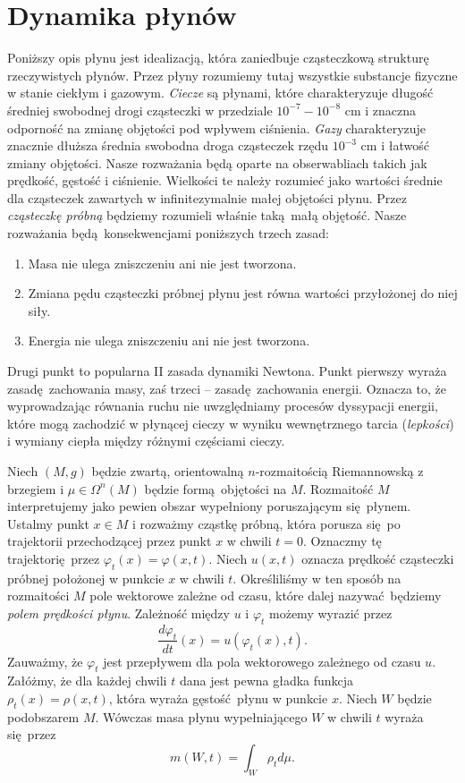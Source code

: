 \section{Dynamika płynów}

Poniższy opis płynu jest idealizacją, która zaniedbuje cząsteczkową strukturę rzeczywistych płynów. Przez płyny rozumiemy tutaj wszystkie substancje fizyczne w stanie ciekłym i gazowym. \emph{Ciecze} są płynami, które charakteryzuje długość średniej swobodnej drogi cząsteczki w przedziale \(10^{-7} - 10^{-8}\) cm i znaczna odporność na zmianę objętości pod wpływem ciśnienia. \emph{Gazy} charakteryzuje znacznie dłuższa średnia swobodna droga cząsteczek rzędu \(10^{-3}\) cm i łatwość zmiany objętości. Nasze rozważania będą oparte na obserwabliach takich jak prędkość, gęstość i ciśnienie. Wielkości te należy rozumieć jako wartości średnie dla cząsteczek zawartych w infinitezymalnie małej objętości płynu. Przez \emph{cząsteczkę próbną} będziemy rozumieli właśnie taką małą objętość. Nasze rozważania będą konsekwencjami poniższych trzech zasad:
\begin{enumerate}
    \item Masa nie ulega zniszczeniu ani nie jest tworzona.
    \item Zmiana pędu cząsteczki próbnej płynu jest równa wartości przyłożonej do niej siły.
    \item Energia nie ulega zniszczeniu ani nie jest tworzona. 
\end{enumerate}
Drugi punkt to popularna II zasada dynamiki Newtona. Punkt pierwszy wyraża zasadę zachowania masy, zaś trzeci – zasadę zachowania energii. Oznacza to, że wyprowadzając równania ruchu nie uwzględniamy procesów dyssypacji energii, które mogą zachodzić w płynącej cieczy w wyniku wewnętrznego tarcia (\emph{lepkości}) i wymiany ciepła między różnymi częściami cieczy.

Niech \((M, g)\) będzie zwartą, orientowalną \(n\)-rozmaitością Riemannowską z brzegiem i \(\mu \in \Omega^n(M)\) będzie formą objętości na \(M\). Rozmaitość \(M\) interpretujemy jako pewien obszar wypełniony poruszającym się płynem. Ustalmy punkt \(x\in M\) i rozważmy cząstkę próbną, która porusza się po trajektorii przechodzącej przez punkt \(x\) w chwili \(t=0\). Oznaczmy tę trajektorię przez \(\varphi_t(x)=\varphi(x,t)\). Niech \(u(x, t)\) oznacza prędkość cząsteczki próbnej położonej w punkcie \(x\) w chwili \(t\). Określiliśmy w ten sposób na rozmaitości \(M\) pole wektorowe zależne od czasu, które dalej nazywać będziemy \emph{polem prędkości płynu}. Zależność między \(u\) i \(\varphi_t\) możemy wyrazić przez
\begin{equation}\label{eq:first-step}
    \frac{d\varphi_t}{dt}(x) = u(\varphi_t(x), t). 
\end{equation}
Zauważmy, że \(\varphi_t\) jest przepływem dla pola wektorowego zależnego od czasu \(u\). Załóżmy, że dla każdej chwili \(t\) dana jest pewna gładka funkcja \(\rho_t(x)=\rho(x,t)\), która wyraża gęstość płynu w punkcie \(x\). Niech \(W\) będzie podobszarem \(M\). Wówczas masa płynu wypełniającego \(W\) w chwili \(t\) wyraża się przez
\begin{equation}\label{eq:mass}
    m(W,t) = \int_W \rho_t d\mu.
\end{equation}


